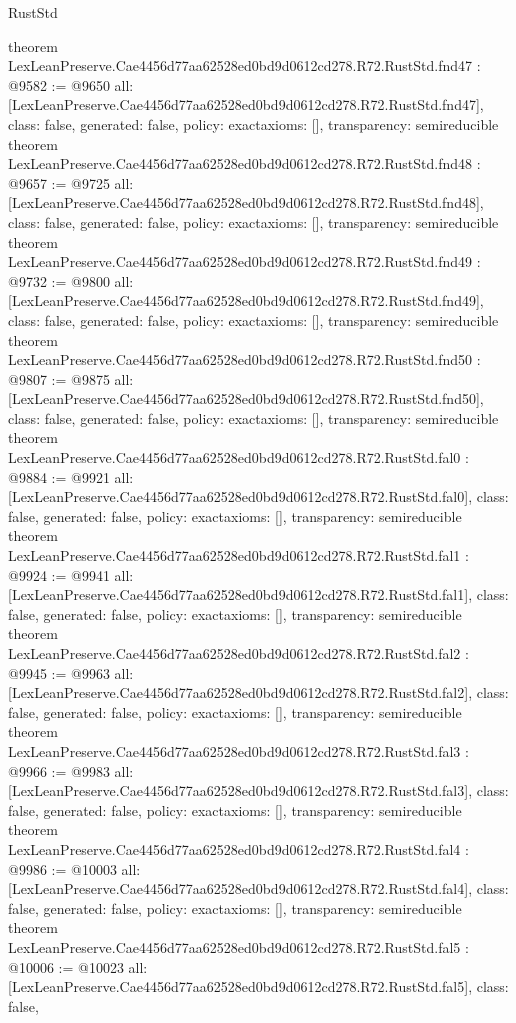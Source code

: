 \begin{lexlean}{RustStd}
\begin{coremodule}
{}
theorem LexLeanPreserve.Cae4456d77aa62528ed0bd9d0612cd278.R72.RustStd.fnd47 : @9582 := @9650 {
  all: [LexLeanPreserve.Cae4456d77aa62528ed0bd9d0612cd278.R72.RustStd.fnd47],
  class: false,
  generated: false,
  policy: exact{axioms: []},
  transparency: semireducible
}
theorem LexLeanPreserve.Cae4456d77aa62528ed0bd9d0612cd278.R72.RustStd.fnd48 : @9657 := @9725 {
  all: [LexLeanPreserve.Cae4456d77aa62528ed0bd9d0612cd278.R72.RustStd.fnd48],
  class: false,
  generated: false,
  policy: exact{axioms: []},
  transparency: semireducible
}
theorem LexLeanPreserve.Cae4456d77aa62528ed0bd9d0612cd278.R72.RustStd.fnd49 : @9732 := @9800 {
  all: [LexLeanPreserve.Cae4456d77aa62528ed0bd9d0612cd278.R72.RustStd.fnd49],
  class: false,
  generated: false,
  policy: exact{axioms: []},
  transparency: semireducible
}
theorem LexLeanPreserve.Cae4456d77aa62528ed0bd9d0612cd278.R72.RustStd.fnd50 : @9807 := @9875 {
  all: [LexLeanPreserve.Cae4456d77aa62528ed0bd9d0612cd278.R72.RustStd.fnd50],
  class: false,
  generated: false,
  policy: exact{axioms: []},
  transparency: semireducible
}
theorem LexLeanPreserve.Cae4456d77aa62528ed0bd9d0612cd278.R72.RustStd.fal0 : @9884 := @9921 {
  all: [LexLeanPreserve.Cae4456d77aa62528ed0bd9d0612cd278.R72.RustStd.fal0],
  class: false,
  generated: false,
  policy: exact{axioms: []},
  transparency: semireducible
}
theorem LexLeanPreserve.Cae4456d77aa62528ed0bd9d0612cd278.R72.RustStd.fal1 : @9924 := @9941 {
  all: [LexLeanPreserve.Cae4456d77aa62528ed0bd9d0612cd278.R72.RustStd.fal1],
  class: false,
  generated: false,
  policy: exact{axioms: []},
  transparency: semireducible
}
theorem LexLeanPreserve.Cae4456d77aa62528ed0bd9d0612cd278.R72.RustStd.fal2 : @9945 := @9963 {
  all: [LexLeanPreserve.Cae4456d77aa62528ed0bd9d0612cd278.R72.RustStd.fal2],
  class: false,
  generated: false,
  policy: exact{axioms: []},
  transparency: semireducible
}
theorem LexLeanPreserve.Cae4456d77aa62528ed0bd9d0612cd278.R72.RustStd.fal3 : @9966 := @9983 {
  all: [LexLeanPreserve.Cae4456d77aa62528ed0bd9d0612cd278.R72.RustStd.fal3],
  class: false,
  generated: false,
  policy: exact{axioms: []},
  transparency: semireducible
}
theorem LexLeanPreserve.Cae4456d77aa62528ed0bd9d0612cd278.R72.RustStd.fal4 : @9986 := @10003 {
  all: [LexLeanPreserve.Cae4456d77aa62528ed0bd9d0612cd278.R72.RustStd.fal4],
  class: false,
  generated: false,
  policy: exact{axioms: []},
  transparency: semireducible
}
theorem LexLeanPreserve.Cae4456d77aa62528ed0bd9d0612cd278.R72.RustStd.fal5 : @10006 := @10023 {
  all: [LexLeanPreserve.Cae4456d77aa62528ed0bd9d0612cd278.R72.RustStd.fal5],
  class: false,
}
\end{coremodule}
\end{lexlean}
